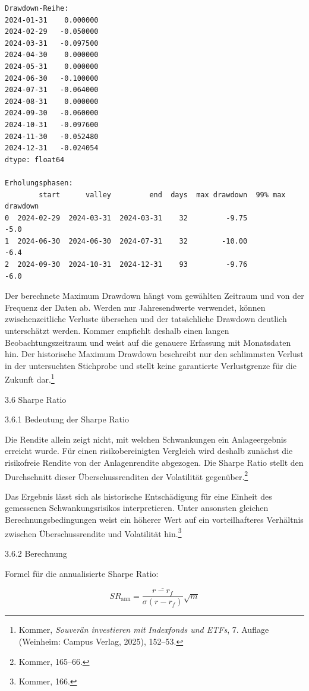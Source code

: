 \documentclass[
  ngerman,
  a4paper,
  DIV=11,
  oneside]{scrreprt}
\begin{document}
\begin{verbatim}
Drawdown-Reihe:
2024-01-31    0.000000
2024-02-29   -0.050000
2024-03-31   -0.097500
2024-04-30    0.000000
2024-05-31    0.000000
2024-06-30   -0.100000
2024-07-31   -0.064000
2024-08-31    0.000000
2024-09-30   -0.060000
2024-10-31   -0.097600
2024-11-30   -0.052480
2024-12-31   -0.024054
dtype: float64

Erholungsphasen:
        start      valley         end  days  max drawdown  99% max drawdown
0  2024-02-29  2024-03-31  2024-03-31    32         -9.75              -5.0
1  2024-06-30  2024-06-30  2024-07-31    32        -10.00              -6.4
2  2024-09-30  2024-10-31  2024-12-31    93         -9.76              -6.0
\end{verbatim}

Der berechnete Maximum Drawdown hängt vom gewählten Zeitraum und von der
Frequenz der Daten ab. Werden nur Jahresendwerte verwendet, können
zwischenzeitliche Verluste übersehen und der tatsächliche Drawdown
deutlich unterschätzt werden. Kommer empfiehlt deshalb einen langen
Beobachtungszeitraum und weist auf die genauere Erfassung mit
Monatsdaten hin. Der historische Maximum Drawdown beschreibt nur den
schlimmsten Verlust in der untersuchten Stichprobe und stellt keine
garantierte Verlustgrenze für die Zukunft dar.\footnote{Kommer,
  \emph{Souverän investieren mit Indexfonds und ETFs}, 7. Auflage
  (Weinheim: Campus Verlag, 2025), 152--53.}

3.6 Sharpe Ratio

3.6.1 Bedeutung der Sharpe Ratio

Die Rendite allein zeigt nicht, mit welchen Schwankungen ein
Anlageergebnis erreicht wurde. Für einen risikobereinigten Vergleich
wird deshalb zunächst die risikofreie Rendite von der Anlagenrendite
abgezogen. Die Sharpe Ratio stellt den Durchschnitt dieser
Überschussrenditen der Volatilität gegenüber.\footnote{Kommer, 165--66.}

Das Ergebnis lässt sich als historische Entschädigung für eine Einheit
des gemessenen Schwankungsrisikos interpretieren. Unter ansonsten
gleichen Berechnungsbedingungen weist ein höherer Wert auf ein
vorteilhafteres Verhältnis zwischen Überschussrendite und Volatilität
hin.\footnote{Kommer, 166.}

3.6.2 Berechnung

Formel für die annualisierte Sharpe Ratio:

\[
SR_{\mathrm{ann}} = \frac{\overline{r-r_f}}{\sigma(r-r_f)}\sqrt{m}
\]
\end{document}

